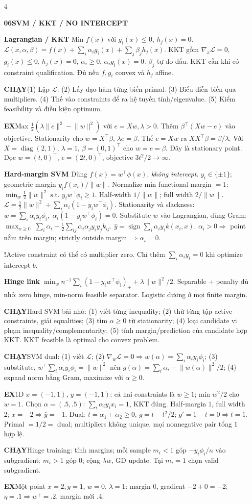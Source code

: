 \documentclass[a4paper]{article}
\newcommand{\topic}[2]{\par\addvspace{.8pt}%
  \begingroup\setlength{\fboxsep}{0.5pt}%
  \noindent\colorbox{structure}{\parbox{\dimexpr\linewidth-2\fboxsep\relax}{%
    \color{white}\fontsize{6.5}{7.1}\selectfont\bfseries #1\enspace #2}}%
  \endgroup\par\nobreak\vspace{.3pt}\nobreak}
\newcommand{\run}[1]{\key{CHẠY}#1}
\newcommand{\key}[1]{\par\textcolor{structure}{\textbf{#1}}\enspace}
\newcommand{\note}[4]{\par\begingroup\setlength{\fboxsep}{0.15pt}%
  \noindent\colorbox{#1}{\parbox{\dimexpr\linewidth-2\fboxsep\relax}{%
    \RaggedRight\textcolor{#2}{\textbf{#3}}\enspace #4}}%
  \endgroup\par}
\newcommand{\trap}[1]{\note{warningbg}{warning}{!}{#1}}
\newcommand{\ex}[1]{\note{examplebg}{example}{EX}{#1}}
\newcommand{\norm}[1]{\lVert#1\rVert}
\newcommand{\diag}{\operatorname{diag}}
\begin{document}
\begin{multicols*}{4}
\topic{06}{SVM / KKT / NO INTERCEPT}
\key{Lagrangian / KKT}
Min $f(x)$ với $g_i(x)\le0,\ h_j(x)=0$.
$\mathcal L(x,\alpha,\beta)=f(x)+\sum_i\alpha_i g_i(x)+\sum_j\beta_j h_j(x)$.
KKT gồm $\nabla_x\mathcal L=0$, $g_i(x)\le0$, $h_j(x)=0$, $\alpha_i\ge0$, $\alpha_i g_i(x)=0$. $\beta_j$ tự do dấu. KKT cần khi có constraint qualification. Đủ nếu $f,g_i$ convex và $h_j$ affine.
\run{(1) Lập $\mathcal L$. (2) Lấy đạo hàm từng biến primal. (3) Biểu diễn biến qua multipliers. (4) Thế vào constraints để ra hệ tuyến tính/eigenvalue. (5) Kiểm feasibility và điều kiện optimum.}
\ex{Max $\tfrac12(\lambda\norm e^2-\norm w^2)$ với $e=Xw,\lambda>0$. Thêm $\beta^\top(Xw-e)$ vào objective. Stationarity cho $w=X^\top\beta$, $\lambda e=\beta$. Thế $e=Xw$ ra $XX^\top\beta=\beta/\lambda$. Với $X=\diag(2,1)$, $\lambda=1$, $\beta=(0,1)^\top$ cho $w=e=\beta$. Đây là stationary point. Dọc $w=(t,0)^\top$, $e=(2t,0)^\top$, objective $3t^2/2\to\infty$.}
\key{Hard-margin SVM}
Dùng $f(x)=w^\top\phi(x)$, \emph{không intercept}. $y_i\in\{\pm1\}$; geometric margin $y_if(x_i)/\norm w$. Normalize min functional margin $=1$:
$\min_w\tfrac12\norm w^2\;\text{s.t. }y_iw^\top\phi_i\ge1.$
Half-width $1/\norm w$; full width $2/\norm w$.
$\mathcal L=\tfrac12\norm w^2+\sum_i\alpha_i(1-y_iw^\top\phi_i).$
Stationarity và slackness:
$w=\sum_i\alpha_i y_i\phi_i,\; \alpha_i(1-y_iw^\top\phi_i)=0.$
Substitute $w$ vào Lagrangian, dùng Gram:
$\max_{\alpha\ge0}\;\sum_i\alpha_i-\tfrac12\sum_{ij}\alpha_i\alpha_jy_iy_jk_{ij}.$
$\hat y=\operatorname{sign}\sum_i\alpha_iy_i k(x_i,x).$
$\alpha_i>0\Rightarrow$ point nằm trên margin;
strictly outside margin $\Rightarrow\alpha_i=0$.
\trap{Active constraint có thể có multiplier zero. Chỉ thêm $\sum_i\alpha_iy_i=0$ khi optimize intercept $b$.}
\key{Hinge link}
$\min_w n^{-1}\sum_i(1-y_iw^\top\phi_i)_++\lambda\norm w^2/2$. Separable + penalty đủ nhỏ: zero hinge, min-norm feasible separator. Logistic dương ở mọi finite margin.
\run{Hard SVM bài nhỏ: (1) viết từng inequality; (2) thử từng tập active constraints, giải equalities; (3) tìm $\alpha\ge0$ từ stationarity; (4) loại candidate vi phạm inequality/complementarity; (5) tính margin/prediction của candidate hợp KKT. KKT feasible là optimal cho convex problem.}
\run{SVM dual: (1) viết $\mathcal L$; (2) $\nabla_w\mathcal L=0\Rightarrow w(\alpha)=\sum_i\alpha_i y_i\phi_i$; (3) substitute, $w^\top\sum_i\alpha_i y_i\phi_i=\norm w^2$ nên $g(\alpha)=\sum_i\alpha_i-\norm{w(\alpha)}^2/2$; (4) expand norm bằng Gram, maximize với $\alpha\ge0$.}
\ex{1D $x=(-1,1)$, $y=(-1,1)$: cả hai constraints là $w\ge1$; min $w^2/2$ cho $w=1$. Chọn $\alpha=(.5,.5)$: $\sum_i\alpha_i y_ix_i=1$, KKT đúng. Half-margin $1$, full width $2$; $x=-2\Rightarrow\hat y=-1$. Dual: $t=\alpha_1+\alpha_2\ge0$, $g=t-t^2/2$; $g'=1-t=0\Rightarrow t=1$. Primal $=1/2=$ dual; multipliers không unique, mọi nonnegative pair tổng $1$ hợp lệ.}
\run{Hinge training: tính margins; mỗi sample $m_i<1$ góp $-y_i\phi_i/n$ vào subgradient; $m_i>1$ góp $0$; cộng $\lambda w$, GD update. Tại $m_i=1$ chọn valid subgradient.}
\ex{Một point $x=2,y=1$, $w=0$, $\lambda=1$: margin $0$, gradient $-2+0=-2$; $\eta=.1\Rightarrow w^+=.2$, margin mới $.4$.}


\end{multicols*}
\end{document}
